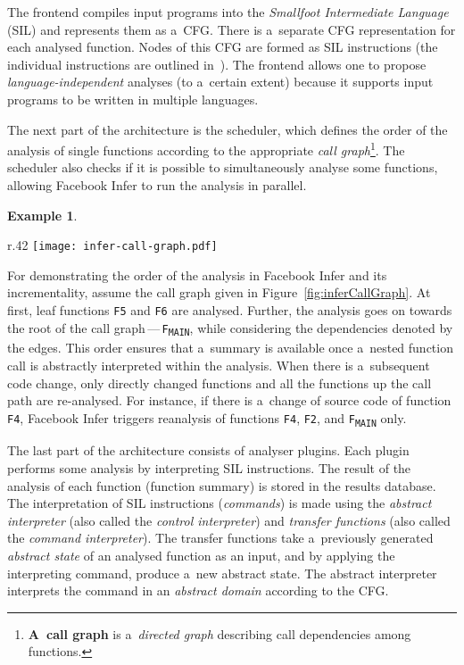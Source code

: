 \documentclass{ExcelAtFIT}
\theoremstyle{example}
\newtheorem{example}{Example}[section]
\begin{document}
The frontend compiles input programs into the \emph{Smallfoot Intermediate Language} (SIL) and represents them as a~CFG. There is a~separate CFG representation for each analysed function. Nodes of this CFG are formed as SIL instructions (the individual instructions are outlined in~\cite{harmimBP}). The frontend allows one to propose \emph{language-independent} analyses (to a~certain extent) because it supports input programs to be written in multiple languages.

The next part of the architecture is the scheduler, which defines the order of the analysis of single functions according to the appropriate \emph{call graph}\footnote{\textbf{A~call graph} is a~\emph{directed graph} describing call dependencies among functions.}. The scheduler also checks if it is possible to simultaneously analyse some functions, allowing Facebook Infer to run the analysis in parallel.

\begin{example}
    \label{ex:inferAnalysis}
\end{example}
\vspace{-.3em}
\noindent
\begin{wrapfigure}{r}{.42 \linewidth}
    \centering
    \vspace{-1em}
    \texttt{[image: infer-call-graph.pdf]}
    \label{fig:inferCallGraph}
\end{wrapfigure}
For demonstrating the order of the analysis in Facebook Infer and its incrementality, assume the call graph given in Figure~\ref{fig:inferCallGraph}. At first, leaf functions \texttt{F5} and \texttt{F6} are analysed. Further, the analysis goes on towards the root of the call graph\,---\,\texttt{F\textsubscript{MAIN}}, while considering the dependencies denoted by the edges. This order ensures that a~summary is available once a~nested function call is abstractly interpreted within the analysis. When there is a~subsequent code change, only directly changed functions and all the functions up the call path are re-analysed. For instance, if there is a~change of source code of function \texttt{F4}, Facebook Infer triggers reanalysis of functions \texttt{F4}, \texttt{F2}, and \texttt{F\textsubscript{MAIN}} only.

The last part of the architecture consists of analyser plugins. Each plugin performs some analysis by interpreting SIL instructions. The result of the analysis of each function (function summary) is stored in the results database. The interpretation of SIL instructions (\emph{commands}) is made using the \emph{abstract interpreter} (also called the \emph{control interpreter}) and \emph{transfer functions} (also called the \emph{command interpreter}). The transfer functions take a~previously generated \emph{abstract state} of an analysed function as an input, and by applying the interpreting command, produce a~new abstract state. The abstract interpreter interprets the command in an \emph{abstract domain} according to the CFG.
\end{document}
